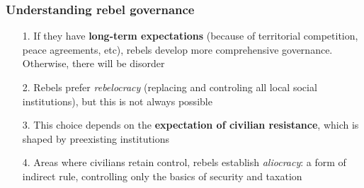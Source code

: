 \documentclass[aspectratio=43]{beamer}
\begin{document}
\begin{frame}
\frametitle{Understanding rebel governance}
\centering

  \begin{itemize}[<+->]
    \item[1.] If they have \textbf{long-term expectations} (because of territorial competition, peace agreements, etc), rebels develop more comprehensive governance. Otherwise, there will be disorder
    \item[2.] Rebels prefer \textit{rebelocracy} (replacing and controling all local social institutions), but this is not always possible
    \item[3.] This choice depends on the \textbf{expectation of civilian resistance}, which is shaped by preexisting institutions
    \item[4.] Areas where civilians retain control, rebels establish \textit{aliocracy}: a form of indirect rule, controlling only the basics of security and taxation
  \end{itemize}


\end{frame}
\end{document}
